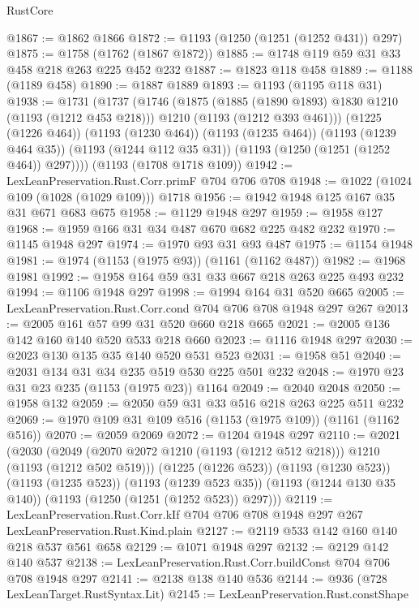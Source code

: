 \begin{lexlean}{RustCore}
\begin{coremodule}
@1867 := @1862 @1866
@1872 := @1193 (@1250 (@1251 (@1252 @431)) @297)
@1875 := @1758 (@1762 (@1867 @1872))
@1885 := @1748 @119 @59 @31 @33 @458 @218 @263 @225 @452 @232
@1887 := @1823 @118 @458
@1889 := @1188 (@1189 @458)
@1890 := @1887 @1889
@1893 := @1193 (@1195 @118 @31)
@1938 := @1731
    (@1737
      (@1746
        (@1875
          (@1885 (@1890 @1893) @1830 @1210 (@1193 (@1212 @453 @218)))
          @1210
          (@1193 (@1212 @393 @461)))
        (@1225 (@1226 @464))
        (@1193 (@1230 @464))
        (@1193 (@1235 @464))
        (@1193 (@1239 @464 @35))
        (@1193 (@1244 @112 @35 @31))
        (@1193 (@1250 (@1251 (@1252 @464)) @297))))
    (@1193 (@1708 @1718 @109))
@1942 := LexLeanPreservation.Rust.Corr.primF @704 @706 @708
@1948 := @1022 (@1024 @109 (@1028 (@1029 @109))) @1718
@1956 := @1942 @1948 @125 @167 @35 @31 @671 @683 @675
@1958 := @1129 @1948 @297
@1959 := @1958 @127
@1968 := @1959 @166 @31 @34 @487 @670 @682 @225 @482 @232
@1970 := @1145 @1948 @297
@1974 := @1970 @93 @31 @93 @487
@1975 := @1154 @1948
@1981 := @1974 (@1153 (@1975 @93)) (@1161 (@1162 @487))
@1982 := @1968 @1981
@1992 := @1958 @164 @59 @31 @33 @667 @218 @263 @225 @493 @232
@1994 := @1106 @1948 @297
@1998 := @1994 @164 @31 @520 @665
@2005 := LexLeanPreservation.Rust.Corr.cond @704 @706 @708 @1948 @297 @267
@2013 := @2005 @161 @57 @99 @31 @520 @660 @218 @665
@2021 := @2005 @136 @142 @160 @140 @520 @533 @218 @660
@2023 := @1116 @1948 @297
@2030 := @2023 @130 @135 @35 @140 @520 @531 @523
@2031 := @1958 @51
@2040 := @2031 @134 @31 @34 @235 @519 @530 @225 @501 @232
@2048 := @1970 @23 @31 @23 @235 (@1153 (@1975 @23)) @1164
@2049 := @2040 @2048
@2050 := @1958 @132
@2059 := @2050 @59 @31 @33 @516 @218 @263 @225 @511 @232
@2069 := @1970 @109 @31 @109 @516 (@1153 (@1975 @109)) (@1161 (@1162 @516))
@2070 := @2059 @2069
@2072 := @1204 @1948 @297
@2110 := @2021
    (@2030
      (@2049 (@2070 @2072 @1210 (@1193 (@1212 @512 @218))) @1210 (@1193 (@1212 @502 @519)))
      (@1225 (@1226 @523))
      (@1193 (@1230 @523))
      (@1193 (@1235 @523))
      (@1193 (@1239 @523 @35))
      (@1193 (@1244 @130 @35 @140))
      (@1193 (@1250 (@1251 (@1252 @523)) @297)))
@2119 := LexLeanPreservation.Rust.Corr.kIf
    @704
    @706
    @708
    @1948
    @297
    @267
    LexLeanPreservation.Rust.Kind.plain
@2127 := @2119 @533 @142 @160 @140 @218 @537 @561 @658
@2129 := @1071 @1948 @297
@2132 := @2129 @142 @140 @537
@2138 := LexLeanPreservation.Rust.Corr.buildConst @704 @706 @708 @1948 @297
@2141 := @2138 @138 @140 @536
@2144 := @936 (@728 LexLeanTarget.RustSyntax.Lit)
@2145 := LexLeanPreservation.Rust.constShape

\end{coremodule}
\end{lexlean}
